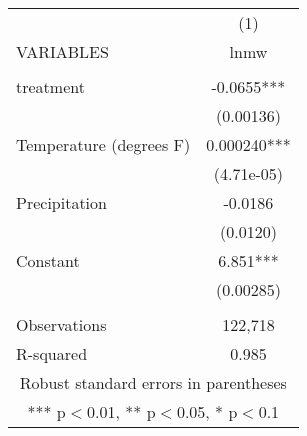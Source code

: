 \begin{tabular}{lc} \hline
 & (1) \\
VARIABLES & lnmw \\ \hline
 &  \\
treatment & -0.0655*** \\
 & (0.00136) \\
Temperature (degrees F) & 0.000240*** \\
 & (4.71e-05) \\
Precipitation & -0.0186 \\
 & (0.0120) \\
Constant & 6.851*** \\
 & (0.00285) \\
 &  \\
Observations & 122,718 \\
 R-squared & 0.985 \\ \hline
\multicolumn{2}{c}{ Robust standard errors in parentheses} \\
\multicolumn{2}{c}{ *** p$<$0.01, ** p$<$0.05, * p$<$0.1} \\
\end{tabular}
